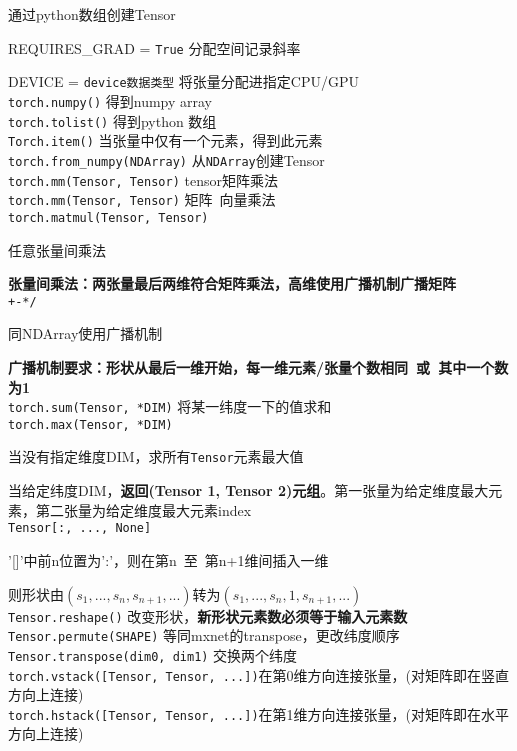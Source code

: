 \documentclass[UTF8]{ctexart}
\begin{document}
  通过python数组创建Tensor

  REQUIRES\_GRAD = \texttt{True} 分配空间记录斜率
  
  DEVICE = \texttt{device数据类型} 将张量分配进指定CPU/GPU\\
\texttt{torch.numpy()} 得到numpy array \\
\texttt{torch.tolist()} 得到python 数组 \\
\texttt{Torch.item()} 当张量中仅有一个元素，得到此元素 \\
\texttt{torch.from\_numpy(NDArray)} 从\texttt{NDArray}创建Tensor\\
\texttt{torch.mm(Tensor, Tensor)} tensor矩阵乘法\\
\texttt{torch.mm(Tensor, Tensor)} 矩阵\ 向量乘法\\
\texttt{torch.matmul(Tensor, Tensor)} 

  任意张量间乘法
  
  \textbf{张量间乘法：两张量最后两维符合矩阵乘法，高维使用广播机制广播矩阵}\\
\texttt{+-*/} 

  同NDArray使用广播机制
  
  \textbf{广播机制要求：形状从最后一维开始，每一维元素/张量个数相同\ 或\ 其中一个数为1}\\
\texttt{torch.sum(Tensor, *DIM)} 将某一纬度一下的值求和\\
\texttt{torch.max(Tensor, *DIM)} 

  当没有指定维度DIM，求所有\texttt{Tensor}元素最大值
  
  当给定纬度DIM，\textbf{返回(Tensor 1, Tensor 2)元组}。第一张量为给定维度最大元素，第二张量为给定维度最大元素index\\
\texttt{Tensor[:, ..., None]} 
  
  '[]'中前n位置为':'，则在第n\ 至\ 第n+1维间插入一维

  则形状由$(s_1, ..., s_n, s_{n+1}, ...)$转为$(s_1, ..., s_n, 1, s_{n+1}, ...)$\\
\texttt{Tensor.reshape()} 改变形状，\textbf{新形状元素数必须等于输入元素数}\\
\texttt{Tensor.permute(SHAPE)} 等同mxnet的transpose，更改纬度顺序\\
\texttt{Tensor.transpose(dim0, dim1)} 交换两个纬度\\
\texttt{torch.vstack([Tensor, Tensor, ...])}在第0维方向连接张量，(对矩阵即在竖直方向上连接)\\
\texttt{torch.hstack([Tensor, Tensor, ...])}在第1维方向连接张量，(对矩阵即在水平方向上连接)
\end{document}
